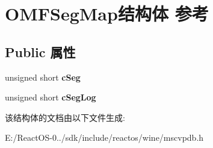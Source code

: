 \hypertarget{struct_o_m_f_seg_map}{}\section{O\+M\+F\+Seg\+Map结构体 参考}
\label{struct_o_m_f_seg_map}
\subsection*{Public 属性}
\begin{DoxyCompactItemize}
\item 
\mbox{\label{struct_o_m_f_seg_map_a6f8ae473797b8eb78f32dd4e0827c653}} 
unsigned short {\bfseries c\+Seg}
\item 
\mbox{\label{struct_o_m_f_seg_map_ae910bd2535f0a0dd8e89d4e6e8956bab}} 
unsigned short {\bfseries c\+Seg\+Log}
\end{DoxyCompactItemize}


该结构体的文档由以下文件生成\+:\begin{DoxyCompactItemize}
\item 
E\+:/\+React\+O\+S-\/0../sdk/include/reactos/wine/mscvpdb.\+h\end{DoxyCompactItemize}
